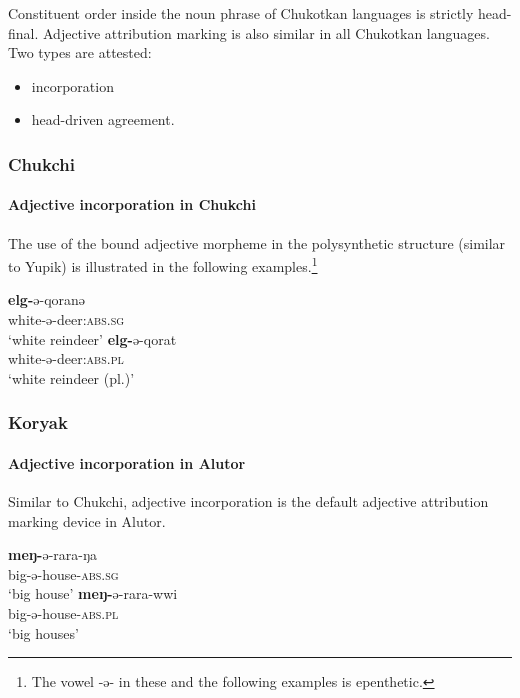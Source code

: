 Constituent order inside the noun phrase of Chukotkan languages is strictly head-final. Adjective attribution marking is also similar in all Chukotkan languages. Two types are attested:
\begin{itemize}
\item incorporation
\item head\hyp{}driven agreement.
\end{itemize}

\subsubsection{Chukchi}
\paragraph*{Adjective incorporation in Chukchi}
The use of the bound adjective morpheme in the polysynthetic structure (similar to Yupik) is illustrated in the following examples.\footnote{The vowel -ə- in these and the following examples is epenthetic.}
\begin{exe}
\begin{xlist}
\ex	
\gll	\textbf{elg-}ə-qoranə\\
	white-ə-deer:\textsc{abs.sg}\\
\glt	‘white reindeer’
\ex
\gll	\textbf{elg-}ə-qorat\\
	white-ə-deer:\textsc{abs.pl}\\
\glt	‘white reindeer (pl.)’
\end{xlist}
\end{exe}

\subsubsection{Koryak}
\paragraph*{Adjective incorporation in Alutor}
Similar to Chukchi, adjective incorporation is the default adjective attribution marking device in Alutor.
\begin{exe}
\begin{xlist}
\ex
\gll	\textbf{meŋ-}ə-rara-ŋa\\
	big-ə-house-\textsc{abs.sg}\\
\glt	‘big house’
\ex
\gll	\textbf{meŋ-}ə-rara-wwi\\
	big-ə-house-\textsc{abs.pl}\\
\glt	‘big houses’
\end{xlist}
\end{exe}

